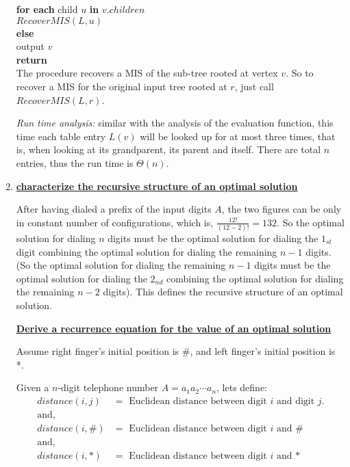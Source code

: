 \documentclass[11pt]{article}
\begin{document}
\begin{enumerate}
  \-\hspace{6em} \textbf{for each} child $u$ \textbf{in} $v.children$ \\ 
  \-\hspace{8em} $RecoverMIS(L, u)$ \\
  \-\hspace{4em} \textbf{else} \\
  \-\hspace{6em} output $v$ \\
  \-\hspace{6em} \textbf{return} \\

  The procedure recovers a MIS of the sub-tree rooted at vertex $v$. So
  to recover a MIS for the original input tree rooted at $r$, just
  call $RecoverMIS(L, r)$. 

  \emph{Run time analysis:} similar with the analysis of the
  evaluation function, this time each table entry $L(v)$ will be
  looked up for at most three times, that is, when looking at its
  grandparent, its parent and itself. There are total $n$ entries,
  thus the run time is $\Theta(n)$.

\item %
  \underline{\textbf{characterize the recursive structure of an
      optimal solution}} 

  After having dialed a prefix of the input digits $A$, the two
  figures can be only in constant number of configurations, which is,
  $\frac{12!}{(12-2)!} = 132$. So the optimal solution for dialing $n$
  digits must be the
  optimal solution for dialing the $1_{st}$ digit combining the optimal
  solution for dialing the remaining $n-1$ digits. (So the optimal solution
  for dialing the remaining $n-1$ digits must be the optimal solution
  for dialing the $2_{nd}$ combining the optimal solution for dialing
  the remaining $n-2$ digits). This defines the recursive structure of
  an optimal solution.

  \underline{\textbf{Derive a recurrence equation for the value of an
      optimal solution}}

  Assume right finger's initial position is \#, and left finger's
  initial position is *. 

  Given a $n$-digit telephone number $A=a_1a_2 \cdots a_n$, lets 
  define: 
  \begin{equation}
    \begin{split}
    distance(i, j) &= \text{ Euclidean distance between digit $i$ and
      digit } j.\\
    \text{and},\\
    distance(i, \#) &= \text{ Euclidean distance between digit $i$ and \# }\\
    \text{and},\\
    distance(i, *) &= \text{ Euclidean distance between digit $i$ and
      *}
    \end{split}
  \end{equation}


\end{enumerate}
\end{document}
